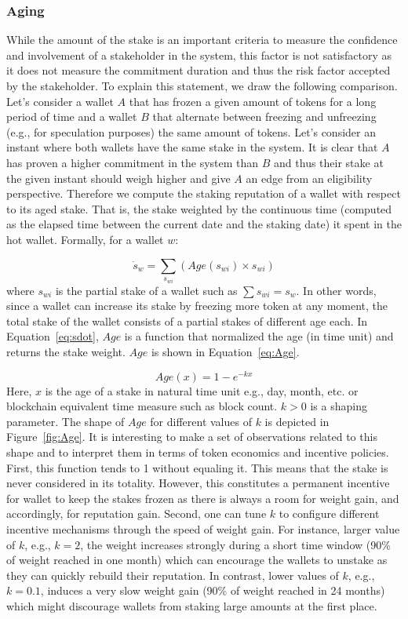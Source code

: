 \documentclass[]{article}
\begin{document}
\subsubsection{Aging}
While the amount of the stake is an important criteria to measure the confidence and involvement of a stakeholder in the system, this factor is not satisfactory as it does not measure the commitment duration and thus the risk factor accepted by the stakeholder. To explain this statement, we draw the following comparison. Let's consider a wallet $A$ that has frozen a given amount of tokens for a long period of time and a wallet $B$ that alternate between freezing and unfreezing (e.g., for speculation purposes) the same amount of tokens. Let's consider an instant where both wallets have the same stake in the system. It is clear that $A$ has proven a higher commitment in the system than $B$ and thus their stake at the given instant should weigh higher and give $A$ an edge from an eligibility perspective. Therefore we compute the staking reputation of a wallet with respect to its aged stake. That is, the stake weighted by the continuous time (computed as the elapsed time between the current date and the staking date) it spent in the hot wallet. Formally, for a wallet $w$:

\begin{equation}
\label{eq:sdot}
\dot{s}_w = \sum_{s_{wi}}{(Age(s_{wi}) \times s_{wi})}
\end{equation}
where $s_{wi}$ is the partial stake of a wallet such as $\sum s_{wi} = s_w$. In other words, since a wallet can increase its stake by freezing more token at any moment, the total stake of the wallet consists of a partial stakes of different age each. In Equation~\ref{eq:sdot}, $Age$ is a function that normalized the age (in time unit) and returns the stake weight. $Age$ is shown in Equation~\ref{eq:Age}.

\begin{equation}
\label{eq:Age}
    Age(x) = 1 - e^{-kx} 
\end{equation}
Here, $x$ is the age of a stake in natural time unit e.g., day, month, etc. or blockchain equivalent time measure such as block count. $k>0$ is a shaping parameter. The shape of $Age$ for different values of $k$ is depicted in Figure~\ref{fig:Age}. It is interesting to make a set of observations related to this shape and to interpret them in terms of token economics and incentive policies. First, this function tends to 1 without equaling it. This means that the stake is never considered in its totality. However, this constitutes a permanent incentive for wallet to keep the stakes frozen as there is always a room for weight gain, and accordingly, for reputation gain. Second, one can tune $k$ to configure different incentive mechanisms through the speed of weight gain. For instance, larger value of $k$, e.g., $k = 2$, the weight increases strongly during a short time window (90\% of weight reached in one month) which can encourage the wallets to unstake as they can quickly rebuild their reputation. In contrast, lower values of $k$, e.g., $k = 0.1$, induces a very slow weight gain (90\% of weight reached in 24 months) which might discourage wallets from staking large amounts at the first place.       
\end{document}
